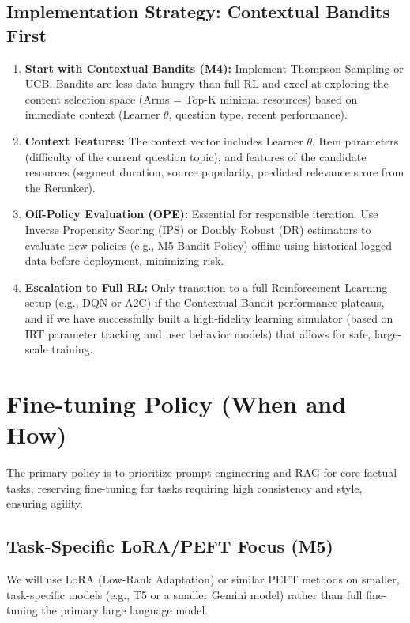 \documentclass[12pt]{article}
\begin{document}
\begin{enumerate}
\subsection{Implementation Strategy: Contextual Bandits First}
\begin{enumerate}
    \item \textbf{Start with Contextual Bandits (M4):} Implement Thompson Sampling or UCB. Bandits are less data-hungry than full RL and excel at exploring the content selection space (Arms = Top-K minimal resources) based on immediate context (Learner $\theta$, question type, recent performance).
    \item \textbf{Context Features:} The context vector includes Learner $\theta$, Item parameters (difficulty of the current question topic), and features of the candidate resources (segment duration, source popularity, predicted relevance score from the Reranker).
    \item \textbf{Off-Policy Evaluation (OPE):} Essential for responsible iteration. Use Inverse Propensity Scoring (IPS) or Doubly Robust (DR) estimators to evaluate new policies (e.g., M5 Bandit Policy) offline using historical logged data before deployment, minimizing risk.
    \item \textbf{Escalation to Full RL:} Only transition to a full Reinforcement Learning setup (e.g., DQN or A2C) if the Contextual Bandit performance plateaus, and if we have successfully built a high-fidelity learning simulator (based on IRT parameter tracking and user behavior models) that allows for safe, large-scale training.
\end{enumerate}

\section{Fine-tuning Policy (When and How)}

The primary policy is to prioritize prompt engineering and RAG for core factual tasks, reserving fine-tuning for tasks requiring high consistency and style, ensuring agility.

\subsection{Task-Specific LoRA/PEFT Focus (M5)}
We will use LoRA (Low-Rank Adaptation) or similar PEFT methods on smaller, task-specific models (e.g., T5 or a smaller Gemini model) rather than full fine-tuning the primary large language model.


\end{enumerate}
\end{document}
